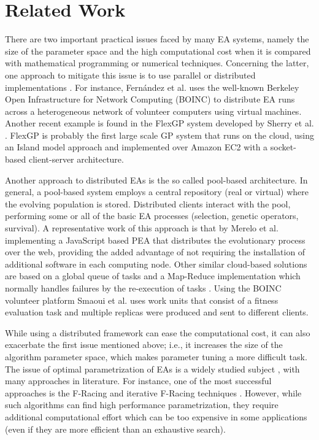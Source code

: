 \section{Related Work}
\label{sec:work}
There are two important practical issues faced by many EA systems, namely the size of the parameter 
space and the high computational cost when it is compared with mathematical programming or numerical techniques.
Concerning the latter, one approach to mitigate this issue is to use parallel or 
distributed implementations \cite{cantu-paz:migration-policies,duda2013gpu}.
For instance, Fern\'andez et al. \cite{nc} %
uses the well-known Berkeley Open Infrastructure for Network Computing (BOINC) to distribute EA runs across a
heterogeneous network of volunteer computers using virtual machines. Another recent example is 
found in the FlexGP system developed by Sherry et al. \cite{sherry2012flex}. FlexGP is probably the first large scale GP system 
that runs on the cloud, using an Island model approach and implemented over Amazon EC2 with a 
socket-based client-server architecture.

Another approach to distributed EAs is the so called pool-based architecture. In general, a 
pool-based system employs a central repository (real or virtual) where the evolving population is stored.
Distributed clients interact with the pool, performing some or all of the basic EA processes 
(selection, genetic operators, survival). A representative work of this approach 
is that by Merelo et al. \cite{agajaj} implementing a JavaScript based PEA that distributes 
the evolutionary process over the web, providing the added advantage of not requiring the 
installation of additional software in each computing node.  Other similar cloud-based solutions 
are based on a global queue of tasks and a Map-Reduce implementation which normally handles failures 
by the re-execution of  tasks \cite{fazenda2012,di2013towards,FlexGP}. Using the BOINC 
volunteer platform  Smaoui et al. \cite{FekiNG09} uses work units that consist of a fitness 
evaluation task and multiple replicas  were produced and sent to different clients.

While using a distributed framework can ease the computational cost, it can also exacerbate the first issue mentioned above;
i.e., it increases the size of the algorithm parameter space, which makes parameter tuning a more difficult task.
The issue of optimal parametrization of EAs is a widely studied subject \cite{de2007parameter}, 
with many approaches in literature. For instance, one of the most successful approaches 
is the F-Racing and iterative F-Racing techniques \cite{lopez2011irace}. 
However, while such algorithms can find high performance parametrization, 
they require additional computational effort which can be too expensive in some applications
(even if they are more efficient than an exhaustive search).




